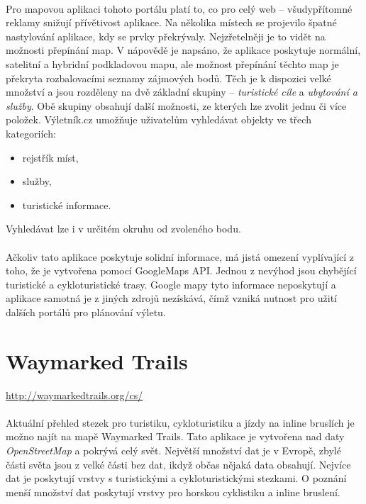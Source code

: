 \documentclass[11pt,a4paper,titlepage,oneside]{book}
\begin{document}
		\paragraph{} Pro mapovou aplikaci tohoto portálu platí to, co pro celý web -- všudy\-přítomné reklamy snižují přívětivost aplikace. Na několika místech se projevilo špatné nastylování aplikace, kdy se prvky překrývaly. Nejzřetelněji je to vidět na možnosti přepínání map. V nápovědě je napsáno, že aplikace poskytuje normální, satelitní a hybridní podkladovou mapu, ale možnost přepínání těchto map je překryta rozbalovacími seznamy zájmových bodů. Těch je k dispozici velké množství a jsou rozděleny na dvě základní skupiny -- \textit{turistické cíle} a \textit{ubytování a služby}. Obě skupiny obsahují další možnosti, ze kterých lze zvolit jednu či více položek. Výletník.cz umožňuje uživatelům vyhledávat objekty ve třech kategoriích:
			\begin{itemize}
				\item rejstřík míst,
				\item služby,
				\item turistické informace.
			\end{itemize}
Vyhledávat lze i v určitém okruhu od zvoleného bodu.
		\paragraph{} Ačkoliv tato aplikace poskytuje solidní informace, má jistá omezení vyplí\-vající z toho, že je vytvořena pomocí GoogleMaps API. Jednou z nevýhod jsou chybějící turistické a cykloturistické trasy. Google mapy tyto informace neposkytují a aplikace samotná je z jiných zdrojů nezískává, čímž vzniká nutnost pro užití dalších portálů pro plánování výletu.	
	
	\section{Waymarked Trails}
		\url{http://waymarkedtrails.org/cs/}


		\paragraph{} Aktuální přehled stezek pro turistiku, cykloturistiku a jízdy na inline bruslích je možno najít na mapě Waymarked Trails\cite{Waymarked}. Tato aplikace je vytvořena nad daty \textit{OpenStreetMap} a pokrývá celý svět. Největší množství dat je v Evropě, zbylé části světa jsou z velké části bez dat, ikdyž občas nějaká data obsahují. Nejvíce dat je poskytují vrstvy s turistickými a cykloturistickými stezkami. O poznání menší množství dat poskytují vrstvy pro horskou cyklistiku a inline bruslení.
\end{document}
